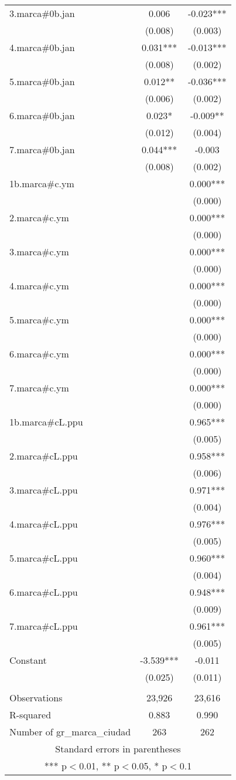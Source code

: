 \begin{tabular}{lcc}
3.marca\#0b.jan & 0.006 & -0.023*** \\
 & (0.008) & (0.003) \\
4.marca\#0b.jan & 0.031*** & -0.013*** \\
 & (0.008) & (0.002) \\
5.marca\#0b.jan & 0.012** & -0.036*** \\
 & (0.006) & (0.002) \\
6.marca\#0b.jan & 0.023* & -0.009** \\
 & (0.012) & (0.004) \\
7.marca\#0b.jan & 0.044*** & -0.003 \\
 & (0.008) & (0.002) \\
1b.marca\#c.ym &  & 0.000*** \\
 &  & (0.000) \\
2.marca\#c.ym &  & 0.000*** \\
 &  & (0.000) \\
3.marca\#c.ym &  & 0.000*** \\
 &  & (0.000) \\
4.marca\#c.ym &  & 0.000*** \\
 &  & (0.000) \\
5.marca\#c.ym &  & 0.000*** \\
 &  & (0.000) \\
6.marca\#c.ym &  & 0.000*** \\
 &  & (0.000) \\
7.marca\#c.ym &  & 0.000*** \\
 &  & (0.000) \\
1b.marca\#cL.ppu &  & 0.965*** \\
 &  & (0.005) \\
2.marca\#cL.ppu &  & 0.958*** \\
 &  & (0.006) \\
3.marca\#cL.ppu &  & 0.971*** \\
 &  & (0.004) \\
4.marca\#cL.ppu &  & 0.976*** \\
 &  & (0.005) \\
5.marca\#cL.ppu &  & 0.960*** \\
 &  & (0.004) \\
6.marca\#cL.ppu &  & 0.948*** \\
 &  & (0.009) \\
7.marca\#cL.ppu &  & 0.961*** \\
 &  & (0.005) \\
Constant & -3.539*** & -0.011 \\
 & (0.025) & (0.011) \\
 &  &  \\
Observations & 23,926 & 23,616 \\
R-squared & 0.883 & 0.990 \\
 Number of gr\_marca\_ciudad & 263 & 262 \\ \hline
\multicolumn{3}{c}{ Standard errors in parentheses} \\
\multicolumn{3}{c}{ *** p$<$0.01, ** p$<$0.05, * p$<$0.1} \\
\end{tabular}
